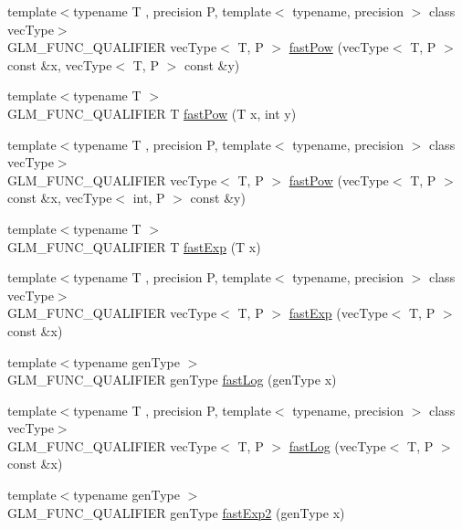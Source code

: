 \begin{DoxyCompactItemize}
\item 
{\footnotesize template$<$typename T , precision P, template$<$ typename, precision $>$ class vec\+Type$>$ }\\G\+L\+M\+\_\+\+F\+U\+N\+C\+\_\+\+Q\+U\+A\+L\+I\+F\+I\+E\+R vec\+Type$<$ T, P $>$ \hyperlink{group__gtx__fast__exponential_ga07b73976a9af4005945bc338b45d8466}{fast\+Pow} (vec\+Type$<$ T, P $>$ const \&x, vec\+Type$<$ T, P $>$ const \&y)
\item 
{\footnotesize template$<$typename T $>$ }\\G\+L\+M\+\_\+\+F\+U\+N\+C\+\_\+\+Q\+U\+A\+L\+I\+F\+I\+E\+R T \hyperlink{namespaceglm_a5a5fcbdc3b4ecfaddf5c66774259bcd3}{fast\+Pow} (T x, int y)
\item 
{\footnotesize template$<$typename T , precision P, template$<$ typename, precision $>$ class vec\+Type$>$ }\\G\+L\+M\+\_\+\+F\+U\+N\+C\+\_\+\+Q\+U\+A\+L\+I\+F\+I\+E\+R vec\+Type$<$ T, P $>$ \hyperlink{namespaceglm_a5afa4ee352971a9d5ce538f4370074e9}{fast\+Pow} (vec\+Type$<$ T, P $>$ const \&x, vec\+Type$<$ int, P $>$ const \&y)
\item 
{\footnotesize template$<$typename T $>$ }\\G\+L\+M\+\_\+\+F\+U\+N\+C\+\_\+\+Q\+U\+A\+L\+I\+F\+I\+E\+R T \hyperlink{group__gtx__fast__exponential_gaa3180ac8f96ab37ab96e0cacaf608e10}{fast\+Exp} (T x)
\item 
{\footnotesize template$<$typename T , precision P, template$<$ typename, precision $>$ class vec\+Type$>$ }\\G\+L\+M\+\_\+\+F\+U\+N\+C\+\_\+\+Q\+U\+A\+L\+I\+F\+I\+E\+R vec\+Type$<$ T, P $>$ \hyperlink{group__gtx__fast__exponential_ga4faf0b61115de36efcf47c4ecb55a5fa}{fast\+Exp} (vec\+Type$<$ T, P $>$ const \&x)
\item 
{\footnotesize template$<$typename gen\+Type $>$ }\\G\+L\+M\+\_\+\+F\+U\+N\+C\+\_\+\+Q\+U\+A\+L\+I\+F\+I\+E\+R gen\+Type \hyperlink{namespaceglm_a68f4f516c08702395c9b76791bab5969}{fast\+Log} (gen\+Type x)
\item 
{\footnotesize template$<$typename T , precision P, template$<$ typename, precision $>$ class vec\+Type$>$ }\\G\+L\+M\+\_\+\+F\+U\+N\+C\+\_\+\+Q\+U\+A\+L\+I\+F\+I\+E\+R vec\+Type$<$ T, P $>$ \hyperlink{group__gtx__fast__exponential_ga789abcbc34d08008d2f5a4547dd6e5e3}{fast\+Log} (vec\+Type$<$ T, P $>$ const \&x)
\item 
{\footnotesize template$<$typename gen\+Type $>$ }\\G\+L\+M\+\_\+\+F\+U\+N\+C\+\_\+\+Q\+U\+A\+L\+I\+F\+I\+E\+R gen\+Type \hyperlink{namespaceglm_a2a49ccff3646c4c60938e09a06f49e50}{fast\+Exp2} (gen\+Type x)

\end{DoxyCompactItemize}
